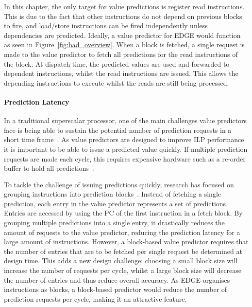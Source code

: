 In this chapter, the only target for value predictions is register read instructions.
This is due to the fact that other instructions do not depend on previous blocks to fire, and load/store instructions can be fired independently unless dependencies are predicted.
Ideally, a value predictor for EDGE would function as seen in Figure~\ref{fig:bad_overview}.
When a block is fetched, a single request is made to the value predictor to fetch all predictions for the read instructions of the block.
At dispatch time, the predicted values are used and forwarded to dependent instructions, whilst the read instructions are issued.
This allows the depending instructions to execute whilst the reads are still being processed.


\paragraph*{Prediction Latency}
In a traditional superscalar processor, one of the main challenges value predictors face is being able to sustain the potential number of prediction requests in a short time frame~\cite{peraisBeBop2015}.
As value predictors are designed to improve ILP performance it is important to be able to issue a predicted value quickly.
If multiple prediction requests are made each cycle, this requires expensive hardware such as a re-order buffer to hold all predictions~\cite{peraisBeBop2015}.

To tackle the challenge of issuing predictions quickly, research has focused on grouping instructions into prediction blocks~\cite{peraisBeBop2015}.
Instead of fetching a single prediction, each entry in the value predictor represents a set of predictions.
Entries are accessed by using the PC of the first instruction in a fetch block.
By grouping multiple predictions into a single entry, it drastically reduces the amount of requests to the value predictor, reducing the prediction latency for a large amount of instructions.
However, a block-based value predictor requires that the number of entries that are to be fetched per single request be determined at design time.
This adds a new design challenge: choosing a small block size will increase the number of requests per cycle, whilst a large block size will decrease the number of entries and thus reduce overall accuracy.
As EDGE organises instructions as blocks, a block-based predictor would reduce the number of prediction requests per cycle, making it an attractive feature.

